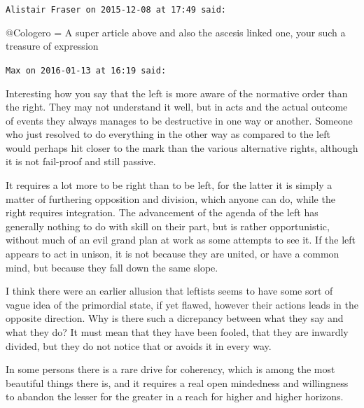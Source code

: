 \begin{footnotesize}\begin{sffamily}



\texttt{Alistair Fraser on 2015-12-08 at 17:49 said: }

@Cologero = A super article above and also the ascesis linked one, your such a treasure of expression


\hfill

\texttt{Max on 2016-01-13 at 16:19 said: }

Interesting how you say that the left is more aware of the normative order than the right. They may not understand it well, but in acts and the actual outcome of events they always manages to be destructive in one way or another. Someone who just resolved to do everything in the other way as compared to the left would perhaps hit closer to the mark than the various alternative rights, although it is not fail-proof and still passive. 

It requires a lot more to be right than to be left, for the latter it is simply a matter of furthering opposition and division, which anyone can do, while the right requires integration. The advancement of the agenda of the left has generally nothing to do with skill on their part, but is rather opportunistic, without much of an evil grand plan at work as some attempts to see it. If the left appears to act in unison, it is not because they are united, or have a common mind, but because they fall down the same slope.

I think there were an earlier allusion that leftists seems to have some sort of vague idea of the primordial state, if yet flawed, however their actions leads in the opposite direction. Why is there such a dicrepancy between what they say and what they do? It must mean that they have been fooled, that they are inwardly divided, but they do not notice that or avoids it in every way.

In some persons there is a rare drive for coherency, which is among the most beautiful things there is, and it requires a real open mindedness and willingness to abandon the lesser for the greater in a reach for higher and higher horizons.


\end{sffamily}\end{footnotesize}
